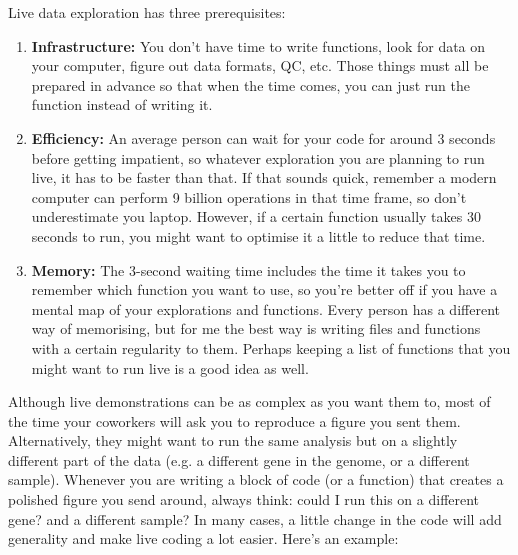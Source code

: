 \documentclass[12pt,a4paper,notitlepage,onecolumn]{article}
\begin{document}
Live data exploration has three prerequisites:
\begin{enumerate}
\item \textbf{Infrastructure:} You don't have time to write functions, look for data on your computer, figure out data formats, QC, etc. Those things must all be prepared in advance so that when the time comes, you can just run the function instead of writing it.
\item \textbf{Efficiency:} An average person can wait for your code for around 3 seconds before getting impatient, so whatever exploration you are planning to run live, it has to be faster than that. If that sounds quick, remember a modern computer can perform 9 billion operations in that time frame, so don't underestimate you laptop. However, if a certain function usually takes 30 seconds to run, you might want to optimise it a little to reduce that time. 
\item \textbf{Memory:} The 3-second waiting time includes the time it takes you to remember which function you want to use, so you're better off if you have a mental map of your explorations and functions. Every person has a different way of memorising, but for me the best way is writing files and functions with a certain regularity to them. Perhaps keeping a list of functions that you might want to run live is a good idea as well.
\end{enumerate}

Although live demonstrations can be as complex as you want them to, most of the time your coworkers will ask you to reproduce a figure you sent them. Alternatively, they might want to run the same analysis but on a slightly different part of the data (e.g. a different gene in the genome, or a different sample). Whenever you are writing a block of code (or a function) that creates a polished figure you send around, always think: could I run this on a different gene? and a different sample? In many cases, a little change in the code will add generality and make live coding a lot easier. Here's an example:
\end{document}
